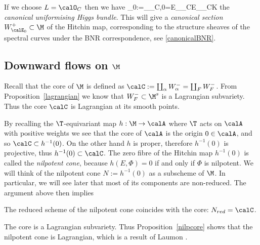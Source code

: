 \begin{remark}
	If we choose  $L=\calO_C$ then we have \beq\label{uniform}\calE_0:=\calE_{{\calO_C},0}=E_{\calO_C}E_{\calO_C}\otimes K \eeq  the {\em canonical uniformising Higgs bundle}. This will give a {\em canonical section} $W^+_{\calE_0}\subset \M$ of the Hitchin map, corresponding to the structure sheaves of the spectral curves under  the BNR correspondence, see \eqref{canonicalBNR}.



\end{remark}

\subsection{Downward flows on $\M$}

Recall that the core of $\M$ is defined as $\calC:=\coprod_\alpha W^-_\alpha = \coprod_F W^-_F$. From Proposition~\ref{lagrangian} we know that $W^-_F\subset \M^s$ is a Lagrangian subvariety. Thus the core $\calC$ is Lagrangian at its smooth points.

By recalling the $\T$-equivariant map $h:\M\to\calA$ where $\T$ acts on $\calA$ with positive weights we see that the core of $\calA$ is the origin $0\in \calA$, and so $\calC\subset h^{-1}(0)$. On the other hand $h$ is proper, therefore $h^{-1}(0)$ is projective, thus $h^{-1}(0)\subset \calC$. The zero fibre of the Hitchin map $h^{-1}(0)$ is called the {\em nilpotent cone}, because $h(E,\Phi)=0$ if and only if $\Phi$ is nilpotent. We will think of the nilpotent cone $N:=h^{-1}(0)$ as a subscheme  of $\M$. In particular, we will see later that most of its components are non-reduced. The argument above then implies

\begin{proposition}
\notready\label{nilpcore} The reduced scheme of the nilpotent cone coincides with the core: $N_{red}=\calC$.
\end{proposition}
\begin{remark}
\notready
	The core is a Lagrangian subvariety. Thus Proposition~\ref{nilpcore} shows that the nilpotent cone is Lagrangian, which is a result of Laumon \cite[Theorem 3]{laumon}.
\end{remark}

